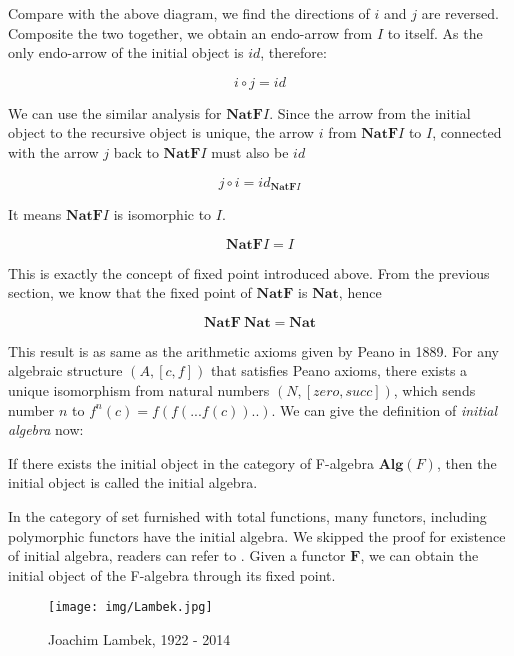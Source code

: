 \documentclass{article}
\begin{document}
Compare with the above diagram, we find the directions of $i$ and $j$ are reversed. Composite the two together, we obtain an endo-arrow from $I$ to itself. As the only endo-arrow of the initial object is $id$, therefore:

\[
i \circ j = id
\]

We can use the similar analysis for $\mathbf{NatF}I$. Since the arrow from the initial object to the recursive object is unique, the arrow $i$ from $\mathbf{NatF}I$ to $I$, connected with the arrow $j$ back to $\mathbf{NatF}I$ must also be $id$

\[
j \circ i = id_{\mathbf{NatF}I}
\]

It means $\mathbf{NatF}I$ is isomorphic to $I$.

\[
  \mathbf{NatF} I = I
\]

This is exactly the concept of fixed point introduced above. From the previous section, we know that the fixed point of $\mathbf{NatF}$ is $\mathbf{Nat}$, hence

\[
  \mathbf{NatF}\ \mathbf{Nat} = \mathbf{Nat}
\]

This result is as same as the arithmetic axioms given by Peano in 1889. For any algebraic structure $(A, [c, f])$ that satisfies Peano axioms, there exists a unique isomorphism from natural numbers $(N, [zero, succ])$, which sends number $n$ to $f^n(c) = f(f(...f(c))..)$. We can give the definition of {\em initial algebra} now:

\begin{definition}
\normalfont
If there exists the initial object in the category of F-algebra $\pmb{Alg}(F)$, then the initial object is called the initial algebra.
\end{definition}

In the category of set furnished with total functions, many functors, including polymorphic functors have the initial algebra. We skipped the proof for existence of initial algebra, readers can refer to \cite{Manes-Arbib-1986}. Given a functor $\mathbf{F}$, we can obtain the initial object of the F-algebra through its fixed point.

\begin{figure}[htbp]
 \centering
 \texttt{[image: img/Lambek.jpg]}
 \captionsetup{labelformat=empty}
 \caption{Joachim Lambek, 1922 - 2014}
 \label{fig:Lambek}
\end{figure}
\end{document}
